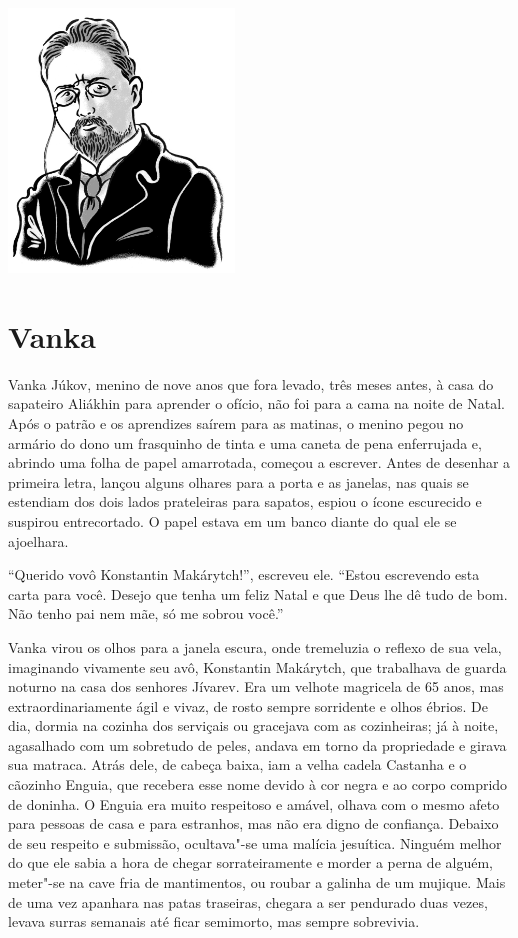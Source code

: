 \pagebreak
\thispagestyle{empty}
\mbox{}
\vfill
\begin{center}
\includegraphics[width=6cm]{./imgs/autor6.jpg}
\end{center}

\chapter{Vanka} \label{part6}

Vanka Júkov, menino de nove anos que fora levado, três meses antes, à
casa do sapateiro Aliákhin para aprender o ofício, não foi para a cama
na noite de Natal. Após o patrão e os aprendizes saírem para as matinas,
o menino pegou no armário do dono um frasquinho de tinta e uma caneta
de pena enferrujada e, abrindo uma folha de papel amarrotada, começou a
escrever. Antes de desenhar a primeira letra, lançou alguns olhares para
a porta e as janelas, nas quais se estendiam dos dois lados prateleiras para sapatos, espiou o ícone escurecido e suspirou
entrecortado. O papel estava em um banco diante do qual ele se
ajoelhara.

``Querido vovô Konstantin Makárytch!'', escreveu ele. ``Estou escrevendo esta carta para você. Desejo que tenha um feliz Natal e que Deus lhe dê
tudo de bom. Não tenho pai nem mãe, só me sobrou você.''

Vanka virou os olhos para a janela escura, onde tremeluzia o reflexo de
sua vela, imaginando vivamente seu avô, Konstantin Makárytch, que
trabalhava de guarda noturno na casa dos senhores Jívarev. Era um
velhote magricela de 65 anos, mas extraordinariamente ágil e vivaz, de
rosto sempre sorridente e olhos ébrios. De dia, dormia na cozinha dos
serviçais ou gracejava com as cozinheiras; já à noite, agasalhado com um
sobretudo de peles, andava em torno da propriedade e girava sua matraca.
Atrás dele, de cabeça baixa, iam a velha cadela Castanha e o cãozinho
Enguia, que recebera esse nome devido à cor negra e ao corpo comprido de
doninha. O Enguia era muito respeitoso e amável, olhava com o mesmo
afeto para pessoas de casa e para estranhos, mas não era digno de
confiança. Debaixo de seu respeito e submissão, ocultava"-se uma malícia
jesuítica. Ninguém melhor do que ele sabia a hora de chegar
sorrateiramente e morder a perna de alguém, meter"-se na cave fria de
mantimentos, ou roubar a galinha de um mujique. Mais de uma vez apanhara
nas patas traseiras, chegara a ser pendurado duas vezes, levava surras
semanais até ficar semimorto, mas sempre sobrevivia.

